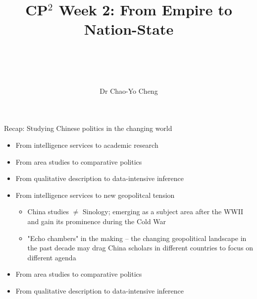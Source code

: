 \documentclass[
  10pt,
  ignorenonframetext,
]{beamer}
\title{\hfill\break
\hfill\break
CP\(^2\) Week 2: From Empire to Nation-State\\
\strut \\}
\author{Dr Chao-Yo Cheng\\}
\date{}
\begin{document}
\frame{\titlepage}

\begin{frame}{Recap: Studying Chinese politics in the changing world}
\protect\hypertarget{recap-studying-chinese-politics-in-the-changing-world}{}
\begin{itemize}
  \item From intelligence services to academic research
  \vspace{0.5cm}
  \item From area studies to comparative politics
  \vspace{0.5cm}
  \item From qualitative description to data-intensive inference
\end{itemize}
\end{frame}

\begin{frame}
\begin{itemize}
  \item From intelligence services to new geopolitcal tension
  \vspace{0.1cm}
  \begin{itemize}
    \item China studies $\neq$ Sinology; emerging as a subject area after the WWII and gain its prominence during the Cold War
    \item "Echo chambers" in the making -- the changing geopolitical landscape in the past decade may drag China scholars in different countries to focus on different agenda
  \end{itemize}
  \vspace{0.3cm}
  \item From area studies to comparative politics
  \vspace{0.3cm}
  \item From qualitative description to data-intensive inference
\end{itemize}
\end{frame}
\end{document}

